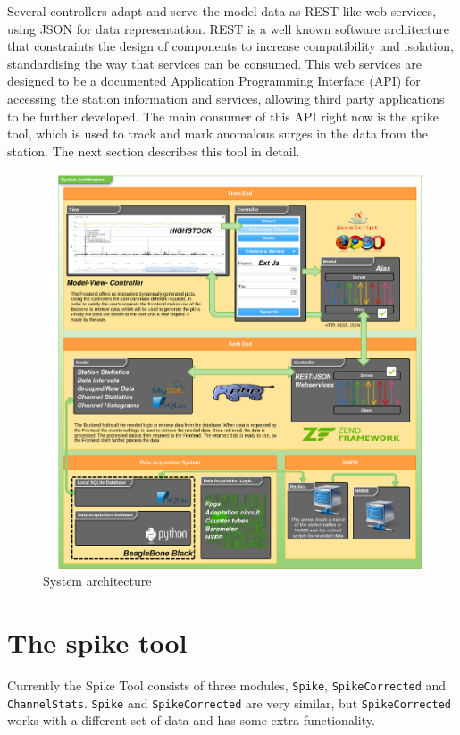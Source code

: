 \documentclass[a4paper]{jpconf}
\begin{document}
Several controllers adapt and serve the model data as REST-like web services,
using JSON\cite{wiki:JSON} for data representation. REST is a well known
software architecture that constraints the design of components to increase
compatibility and isolation, standardising the way that services can be
consumed. This web services are designed to be a documented Application
Programming Interface (API) for accessing the station information and services,
allowing third party applications to be further developed. The main consumer of
this API right now is the spike tool, which is used to track and mark anomalous
surges in the data from the station. The next section describes this tool in
detail.

\begin{figure}[h]
    \centering
    \includegraphics[keepaspectratio, width=1\textwidth]{./resources/Architecture.png}
    \caption{System architecture}
    \label{fig:arch}
\end{figure}

\section{The spike tool}

Currently the Spike Tool consists of three modules, \texttt{Spike},
\texttt{SpikeCorrected} and \texttt{ChannelStats}. \texttt{Spike} and
\texttt{SpikeCorrected} are very similar, but \texttt{SpikeCorrected} works with
a different set of data and has some extra functionality.
\end{document}
